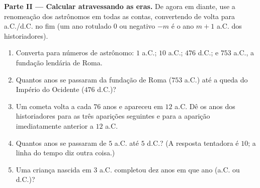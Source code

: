 \begin{problem}
\medskip
\noindent\textbf{Parte II --- Calcular atravessando as eras.}
De agora em diante, use a renomeação dos astrônomos em todas as contas,
convertendo de volta para a.C./d.C. no fim (um ano rotulado $0$ ou
negativo $-m$ é o ano $m + 1$ a.C. dos historiadores).
\begin{enumerate}[resume]
  \item Converta para números de astrônomo: $1$ a.C.; $10$ a.C.;
        $476$ d.C.; e $753$ a.C., a fundação lendária de Roma.
  \item Quantos anos se passaram da fundação de Roma ($753$ a.C.) até
        a queda do Império do Ocidente ($476$ d.C.)?
  \item Um cometa volta a cada $76$ anos e apareceu em $12$ a.C. Dê os
        anos dos historiadores para as três aparições seguintes e para
        a aparição imediatamente anterior a $12$ a.C.
  \item Quantos anos se passaram de $5$ a.C. até $5$ d.C.? (A resposta
        tentadora é $10$; a linha do tempo diz outra coisa.)
  \item Uma criança nascida em $3$ a.C. completou dez anos em que ano
        (a.C. ou d.C.)?
\end{enumerate}


\end{problem}
